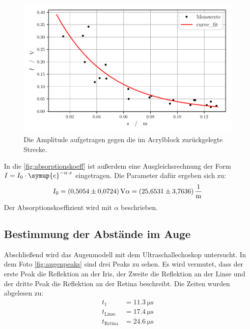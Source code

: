   \begin{figure}[H]
    \centering
    \includegraphics[width=\textwidth]{build/absorptionskoeff.pdf}
    \caption{Die Amplitude aufgetragen gegen die im Acrylblock zurückgelegte Strecke.}
    \label{fig:absorptionskoeff}
  \end{figure}

  \noindent In die \autoref{fig:absorptionskoeff} ist außerdem eine Ausgleichsrechnung der Form $ I = I_0 \cdot \symup{e}^{-\alpha \cdot x} $ eingetragen. 
  Die Parameter dafür ergeben sich zu: 
  \begin{equation*}
    I_0 = \SI{0.5054(724)}{\volt}\\
    \alpha = \SI{25.6531(37636)}{\per\metre}
  \end{equation*}
  Der Absorptionskoeffizient wird mit $\alpha$ beschrieben.


\subsection{Bestimmung der Abstände im Auge}

  Abschließend wird das Augenmodell mit dem Ultraschallechoskop untersucht. In dem Foto \ref{fig:augenpeaks} sind drei Peaks zu sehen. Es wird vermutet, dass der 
  erste Peak die Reflektion an der Iris, der Zweite die Reflektion an der Linse und der dritte Peak die Reflektion an der Retina beschreibt. Die Zeiten wurden 
  abgelesen zu:
  \begin{align*}
    t_1 &= \SI{11.3}{\micro\second} \\
    t_{\text{Linse}} &= \SI{17.4}{\micro\second}\\
    t_{\text{Retina}} &= \SI{24.6}{\micro\second}
  \end{align*}

